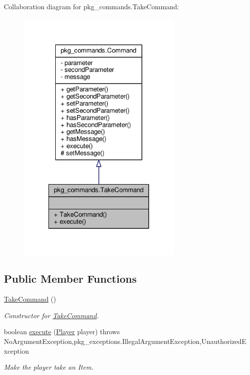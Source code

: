 Collaboration diagram for pkg\-\_\-commands.\-Take\-Command\-:
\nopagebreak
\begin{figure}[H]
\begin{center}
\leavevmode
\includegraphics[width=234pt]{classpkg__commands_1_1TakeCommand__coll__graph}
\end{center}
\end{figure}
\subsection*{Public Member Functions}
\begin{DoxyCompactItemize}
\item 
\hyperlink{classpkg__commands_1_1TakeCommand_a1f6989e8d9dce087d5f70cf748c53119}{Take\-Command} ()
\begin{DoxyCompactList}\small\item\em Constructor for \hyperlink{classpkg__commands_1_1TakeCommand}{Take\-Command}. \end{DoxyCompactList}\item 
boolean \hyperlink{classpkg__commands_1_1TakeCommand_a17789062aaf2ab5747c7eeac118875cd}{execute} (\hyperlink{classpkg__world_1_1Player}{Player} player)  throws No\-Argument\-Exception,pkg\-\_\-exceptions.\-Illegal\-Argument\-Exception,\-Unauthorized\-Exception 
\begin{DoxyCompactList}\small\item\em Make the player take an Item. \end{DoxyCompactList}\end{DoxyCompactItemize}
